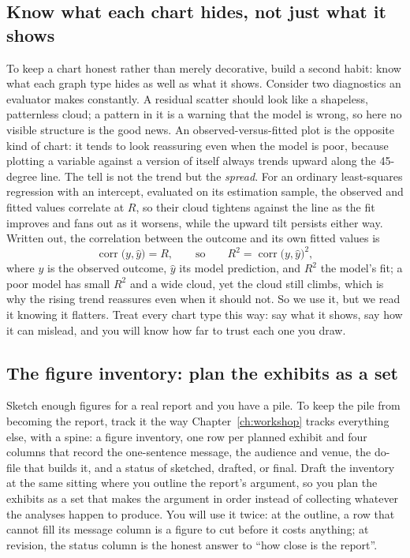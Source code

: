 \documentclass[
    a4paper,
    fontsize=10pt,
    twoside=true,
    numbers=noenddot,
]{kaobook}
\begin{document}
\subsection{Know what each chart hides, not just what it shows}\label{ch09-sc-hides}
To keep a chart honest rather than merely decorative, build a second habit: know what each graph type hides as well as what it shows. Consider two diagnostics an evaluator makes constantly. A residual scatter should look like a shapeless, patternless cloud; a pattern in it is a warning that the model is wrong, so here no visible structure is the good news. An observed-versus-fitted plot is the opposite kind of chart: it tends to look reassuring even when the model is poor, because plotting a variable against a version of itself always trends upward along the 45-degree line. The tell is not the trend but the \emph{spread}. For an ordinary least-squares regression with an intercept, evaluated on its estimation sample, the observed and fitted values correlate at $R$, so their cloud tightens against the line as the fit improves and fans out as it worsens, while the upward tilt persists either way. Written out, the correlation between the outcome and its own fitted values is
\[
\operatorname{corr}\bigl(y,\hat{y}\bigr)=R,
\qquad\text{so}\qquad
R^{2}=\operatorname{corr}\bigl(y,\hat{y}\bigr)^{2},
\]
where $y$ is the observed outcome, $\hat{y}$ its model prediction, and $R^{2}$ the model's fit; a poor model has small $R^{2}$ and a wide cloud, yet the cloud still climbs, which is why the rising trend reassures even when it should not. So we use it, but we read it knowing it flatters. Treat every chart type this way: say what it shows, say how it can mislead, and you will know how far to trust each one you draw.

\subsection{The figure inventory: plan the exhibits as a set}\label{ch09-sc-inventory}
Sketch enough figures for a real report and you have a pile. To keep the pile from becoming the report, track it the way Chapter~\ref{ch:workshop} tracks everything else, with a spine: a figure inventory, one row per planned exhibit and four columns that record the one-sentence message, the audience and venue, the do-file that builds it, and a status of sketched, drafted, or final. Draft the inventory at the same sitting where you outline the report's argument, so you plan the exhibits as a set that makes the argument in order instead of collecting whatever the analyses happen to produce. You will use it twice: at the outline, a row that cannot fill its message column is a figure to cut before it costs anything; at revision, the status column is the honest answer to \enquote{how close is the report}.
\end{document}
